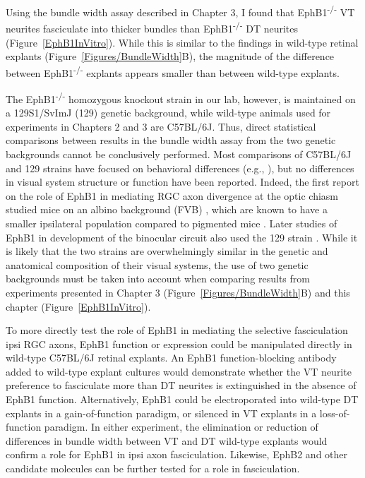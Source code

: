 \label{sec:EphB1Fascic}
Using the bundle width \invitro{} assay described in Chapter 3, I found that EphB1\textsuperscript{-/-} VT neurites fasciculate into thicker bundles than EphB1\textsuperscript{-/-} DT neurites (Figure~\ref{EphB1InVitro}).
While this is similar to the findings in wild-type retinal explants (Figure~\ref{Figures/BundleWidth}B), the magnitude of the difference between EphB1\textsuperscript{-/-} explants appears smaller than between wild-type explants.

The EphB1\textsuperscript{-/-} homozygous knockout strain in our lab, however, is maintained on a 129S1/SvImJ (129) genetic background, while wild-type animals used for experiments in Chapters 2 and 3 are C57BL/6J.
Thus, direct statistical comparisons between results in the bundle width assay from the two genetic backgrounds cannot be conclusively performed.
Most comparisons of C57BL/6J and 129 strains have focused on behavioral differences (e.g., ), but no differences in visual system structure or function have been reported.
Indeed, the first report on the role of EphB1 in mediating RGC axon divergence at the optic chiasm studied mice on an albino background (FVB) \cite{williams2003ephrin}, which are known to have a smaller ipsilateral population compared to pigmented mice \cite{guillery1996albinos}.
Later studies of EphB1 in development of the binocular circuit also used the 129 strain \cite{rebsam2009switching}. 
While it is likely that the two strains are overwhelmingly similar in the genetic and anatomical composition of their visual systems, the use of two genetic backgrounds must be taken into account when comparing results from experiments presented in Chapter 3 (Figure~\ref{Figures/BundleWidth}B) and this chapter (Figure~\ref{EphB1InVitro}).

To more directly test the role of EphB1 in mediating the selective fasciculation ipsi RGC axons, EphB1 function or expression could be manipulated directly in wild-type C57BL/6J retinal explants.
An EphB1 function-blocking antibody added to wild-type explant cultures would demonstrate whether the VT neurite preference to fasciculate more than DT neurites is extinguished in the absence of EphB1 function.
Alternatively, EphB1 could be electroporated into wild-type DT explants in a gain-of-function paradigm, or silenced in VT explants in a loss-of-function paradigm.
In either experiment, the elimination or reduction of differences in bundle width between VT and DT wild-type explants would confirm a role for EphB1 in ipsi axon fasciculation.
Likewise, EphB2 and other candidate molecules can be further tested for a role in fasciculation.


